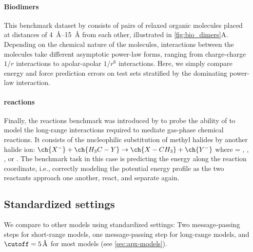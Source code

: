 \documentclass[10pt]{article}
\begin{document}
\paragraph{Biodimers} This benchmark dataset by \cite{hlhc2023} consists of pairs of relaxed organic molecules placed at distances of \qtyrange{4}{15}{\angstrom} from each other, illustrated in \cref{fig:bio_dimers}A. Depending on the chemical nature of the molecules, interactions between the molecules take different asymptotic power-law forms, ranging from charge-charge $1/r$ interactions to apolar-apolar $1/r^6$ interactions. Here, we simply compare energy and force prediction errors on test sets stratified by the dominating power-law interaction.

\paragraph{\sn reactions} Finally, the \sn reactions benchmark was introduced by \cite{fcmu2024} to probe the ability of \mlps to model the long-range interactions required to mediate gas-phase chemical reactions. It consists of the nucleophilic substitution of methyl halides by another halide ion: $\ch{X^-} + \ch{H_3C-Y} \rightarrow \ch{X-CH_3} + \ch{Y^-}$ where  = , , , or . The benchmark task in this case is predicting the energy along the reaction coordinate, i.e., correctly modeling the potential energy profile as the two reactants approach one another, react, and separate again.



\subsection{Standardized settings}
\label{sub:default}

We compare \lorem to other models using standardized settings: Two message-passing steps for short-range models, one message-passing step for long-range models, and $\cutoff=\qty{5}{\angstrom}$ for most models (see \cref{sec:apx-models}).
\end{document}
